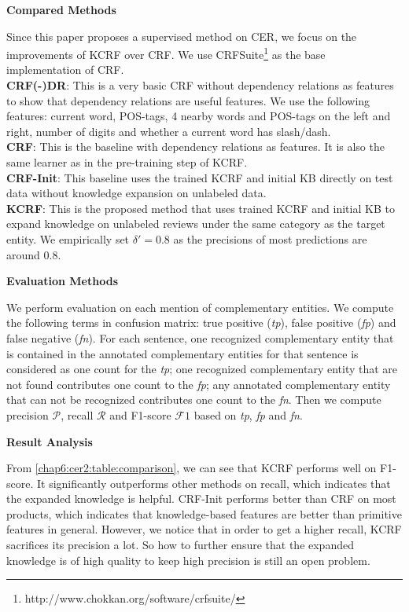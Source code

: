 \textbf{Compared Methods}

Since this paper proposes a supervised method on CER, we focus on the improvements of KCRF over CRF. We use CRFSuite\footnote{http://www.chokkan.org/software/crfsuite/} as the base implementation of CRF.\\
\textbf{CRF(-)DR}: This is a very basic CRF without dependency relations as features to show that dependency relations are useful features. We use the following features: current word, POS-tags, 4 nearby words and POS-tags on the left and right, number of digits and whether a current word has slash/dash.\\
\textbf{CRF}: This is the baseline with dependency relations as features. It is also the same learner as in the pre-training step of KCRF.\\  
\textbf{CRF-Init}: This baseline uses the trained KCRF and initial KB directly on test data without knowledge expansion on unlabeled data.\\
\textbf{KCRF}: This is the proposed method that uses trained KCRF and initial KB to expand knowledge on unlabeled reviews under the same category as the target entity. We empirically set $\delta'=0.8$ as the precisions of most predictions are around 0.8. 

\textbf{Evaluation Methods}

We perform evaluation on each mention of complementary entities. We compute the following terms in confusion matrix: true positive (\textit{tp}), false positive (\textit{fp}) and false negative (\textit{fn}). For each sentence, one recognized complementary entity that is contained in the annotated complementary entities for that sentence is considered as one count for the \textit{tp}; one recognized complementary entity that are not found contributes one count to the \textit{fp}; any annotated complementary entity that can not be recognized contributes one count to the \textit{fn}. Then we compute precision $\mathcal P$, recall $\mathcal R$ and F1-score $\mathcal F1$ based on \textit{tp}, \textit{fp} and \textit{fn}.

\textbf{Result Analysis}

From \ref{chap6:cer2:table:comparison}, we can see that KCRF performs well on F1-score. It significantly outperforms other methods on recall, which indicates that the expanded knowledge is helpful. CRF-Init performs better than CRF on most products, which indicates that knowledge-based features are better than primitive features in general. However, we notice that in order to get a higher recall, KCRF sacrifices its precision a lot. So how to further ensure that the expanded knowledge is of high quality to keep high precision is still an open problem. 

